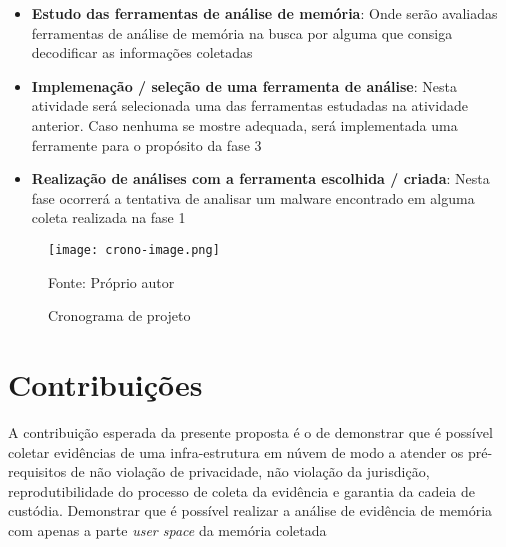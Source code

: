 \begin{itemize}
 \item \textbf{Estudo das ferramentas de análise de memória}: Onde serão avaliadas ferramentas de análise de memória na busca por alguma que consiga decodificar as informações coletadas 
 \item \textbf{Implemenação / seleção de uma ferramenta de análise}: Nesta atividade será selecionada uma das ferramentas estudadas na atividade anterior. Caso nenhuma se mostre adequada, será implementada uma ferramente para o propósito da fase 3
 \item \textbf{Realização de análises com a ferramenta escolhida / criada}: Nesta fase ocorrerá a tentativa de analisar um malware encontrado em alguma coleta realizada na fase 1
\end{itemize}

\begin{figure}[htb!]
\footnotesize
\caption{Cronograma de projeto}
\texttt{[image: crono-image.png]}
\centering
\label{fig:cronograma}
\begin{center}
Fonte: Próprio autor 
\end{center}
\end{figure}

\section{Contribuições}
\label{sec:proposta-contrib}

A contribuição esperada da presente proposta é o de demonstrar que é possível coletar evidências de uma infra-estrutura em núvem de modo a atender os pré-requisitos de não violação de privacidade, não violação da jurisdição, reprodutibilidade do processo de coleta da evidência e garantia da cadeia de custódia.
%
Demonstrar que é possível realizar a análise de evidência de memória com apenas a parte \textit{user space} da memória coletada

